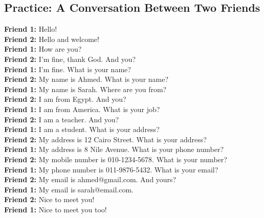 \documentclass[
  a4paper,
  DIV=11,
  numbers=noendperiod]{scrartcl}
\begin{document}
\begin{tcolorbox}[enhanced jigsaw, bottomrule=.15mm, arc=.35mm, colbacktitle=quarto-callout-caution-color!10!white, opacityback=0, toptitle=1mm, title=\textcolor{quarto-callout-caution-color}{\faFire}\hspace{0.5em}{Click to Practice a Conversation}, colframe=quarto-callout-caution-color-frame, opacitybacktitle=0.6, colback=white, coltitle=black, titlerule=0mm, left=2mm, toprule=.15mm, bottomtitle=1mm, rightrule=.15mm, leftrule=.75mm, breakable]

\subsection{Practice: A Conversation Between Two
Friends}\label{practice-a-conversation-between-two-friends}

\textbf{Friend 1:} Hello!\\
\textbf{Friend 2:} Hello and welcome!\\
\textbf{Friend 1:} How are you?\\
\textbf{Friend 2:} I'm fine, thank God. And you?\\
\textbf{Friend 1:} I'm fine. What is your name?\\
\textbf{Friend 2:} My name is Ahmed. What is your name?\\
\textbf{Friend 1:} My name is Sarah. Where are you from?\\
\textbf{Friend 2:} I am from Egypt. And you?\\
\textbf{Friend 1:} I am from America. What is your job?\\
\textbf{Friend 2:} I am a teacher. And you?\\
\textbf{Friend 1:} I am a student. What is your address?\\
\textbf{Friend 2:} My address is 12 Cairo Street. What is your
address?\\
\textbf{Friend 1:} My address is 8 Nile Avenue. What is your phone
number?\\
\textbf{Friend 2:} My mobile number is 010-1234-5678. What is your
number?\\
\textbf{Friend 1:} My phone number is 011-9876-5432. What is your
email?\\
\textbf{Friend 2:} My email is ahmed@gmail.com. And yours?\\
\textbf{Friend 1:} My email is sarah@email.com.\\
\textbf{Friend 2:} Nice to meet you!\\
\textbf{Friend 1:} Nice to meet you too!

\end{tcolorbox}
\end{document}
